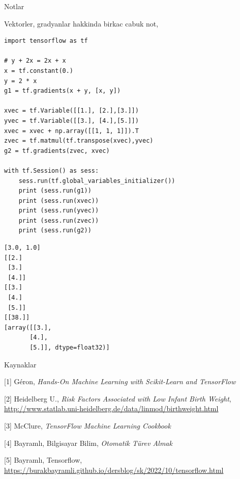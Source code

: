 \documentclass[12pt,fleqn]{article}\usepackage{../../common}
\begin{document}
Notlar

Vektorler, gradyanlar hakkinda birkac cabuk not,

\begin{verbatim}
import tensorflow as tf

# y + 2x = 2x + x
x = tf.constant(0.)
y = 2 * x
g1 = tf.gradients(x + y, [x, y])

xvec = tf.Variable([[1.], [2.],[3.]]) 
yvec = tf.Variable([[3.], [4.],[5.]]) 
xvec = xvec + np.array([[1, 1, 1]]).T
zvec = tf.matmul(tf.transpose(xvec),yvec)
g2 = tf.gradients(zvec, xvec)

with tf.Session() as sess:
    sess.run(tf.global_variables_initializer())
    print (sess.run(g1))
    print (sess.run(xvec))
    print (sess.run(yvec))
    print (sess.run(zvec))
    print (sess.run(g2))
\end{verbatim}

\begin{verbatim}
[3.0, 1.0]
[[2.]
 [3.]
 [4.]]
[[3.]
 [4.]
 [5.]]
[[38.]]
[array([[3.],
       [4.],
       [5.]], dtype=float32)]
\end{verbatim}

Kaynaklar 

[1] Géron, {\em Hands-On Machine Learning with Scikit-Learn and TensorFlow}

[2] Heidelberg U., {\em Risk Factors Associated with Low Infant Birth Weight}, \url{http://www.statlab.uni-heidelberg.de/data/linmod/birthweight.html}

[3] McClure, {\em TensorFlow Machine Learning Cookbook}

[4] Bayramlı, Bilgisayar Bilim, {\em Otomatik Türev Almak}

[5] Bayramlı, Tensorflow, \url{https://burakbayramli.github.io/dersblog/sk/2022/10/tensorflow.html}
\end{document}
